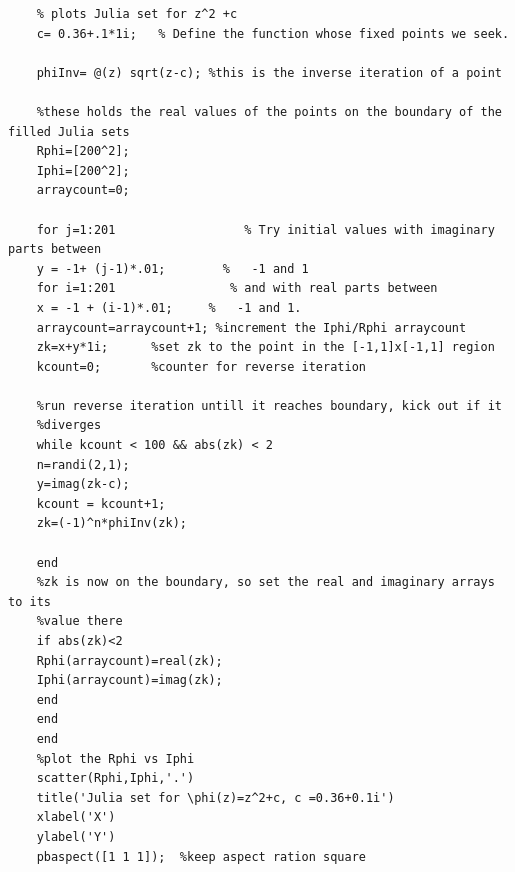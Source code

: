 \documentclass[12pt]{article}
\begin{document}
	\begin{verbatim}
	% plots Julia set for z^2 +c
	c= 0.36+.1*1i;   % Define the function whose fixed points we seek.
	
	phiInv= @(z) sqrt(z-c); %this is the inverse iteration of a point
	
	%these holds the real values of the points on the boundary of the filled Julia sets
	Rphi=[200^2];
	Iphi=[200^2];
	arraycount=0;
	
	for j=1:201                  % Try initial values with imaginary parts between
	y = -1+ (j-1)*.01;        %   -1 and 1
	for i=1:201                % and with real parts between
	x = -1 + (i-1)*.01;     %   -1 and 1.
	arraycount=arraycount+1; %increment the Iphi/Rphi arraycount
	zk=x+y*1i;      %set zk to the point in the [-1,1]x[-1,1] region
	kcount=0;       %counter for reverse iteration
	
	%run reverse iteration untill it reaches boundary, kick out if it
	%diverges
	while kcount < 100 && abs(zk) < 2
	n=randi(2,1);
	y=imag(zk-c);
	kcount = kcount+1;
	zk=(-1)^n*phiInv(zk);
	
	end
	%zk is now on the boundary, so set the real and imaginary arrays to its
	%value there
	if abs(zk)<2
	Rphi(arraycount)=real(zk);
	Iphi(arraycount)=imag(zk);
	end
	end
	end
	%plot the Rphi vs Iphi
	scatter(Rphi,Iphi,'.')
	title('Julia set for \phi(z)=z^2+c, c =0.36+0.1i')
	xlabel('X')
	ylabel('Y')
	pbaspect([1 1 1]);  %keep aspect ration square
		
	\end{verbatim}
	
	
\end{document}
